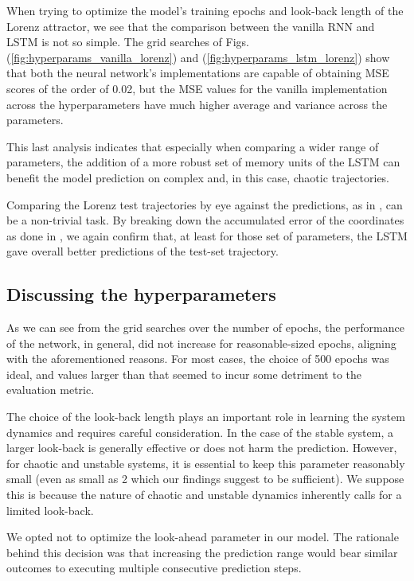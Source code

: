 When trying to optimize the model's training epochs and look-back length of the Lorenz attractor, we see that the comparison between the vanilla RNN and LSTM is not so simple. The grid searches of Figs. (\ref{fig:hyperparams_vanilla_lorenz}) and (\ref{fig:hyperparams_lstm_lorenz}) show that both the neural network's implementations are capable of obtaining MSE scores of the order of 0.02, but the MSE values for the vanilla implementation across the hyperparameters have much higher average and variance across the parameters. 

This last analysis indicates that especially when comparing a wider range of parameters, the addition of a more robust set of memory units of the LSTM can benefit the model prediction on complex and, in this case, chaotic trajectories.

Comparing the Lorenz test trajectories by eye against the predictions, as in , can be a non-trivial task. By breaking down the accumulated error of the coordinates as done in , we again confirm that, at least for those set of parameters, the LSTM gave overall better predictions of the test-set trajectory.

\subsection{Discussing the hyperparameters}

As we can see from the grid searches over the number of epochs, the performance of the network, in general, did not increase for reasonable-sized epochs, aligning with the aforementioned reasons. For most cases, the choice of 500 epochs was ideal, and values larger than that seemed to incur some detriment to the evaluation metric. 

The choice of the look-back length plays an important role in learning the system dynamics and requires careful consideration. In the case of the stable system, a larger look-back is generally effective or does not harm the prediction. However, for chaotic and unstable systems, it is essential to keep this parameter reasonably small (even as small as 2 which our findings suggest to be sufficient). We suppose this is because the nature of chaotic and unstable dynamics inherently calls for a limited look-back.

We opted not to optimize the look-ahead parameter in our model. The rationale behind this decision was that increasing the prediction range would bear similar outcomes to executing multiple consecutive prediction steps. 

